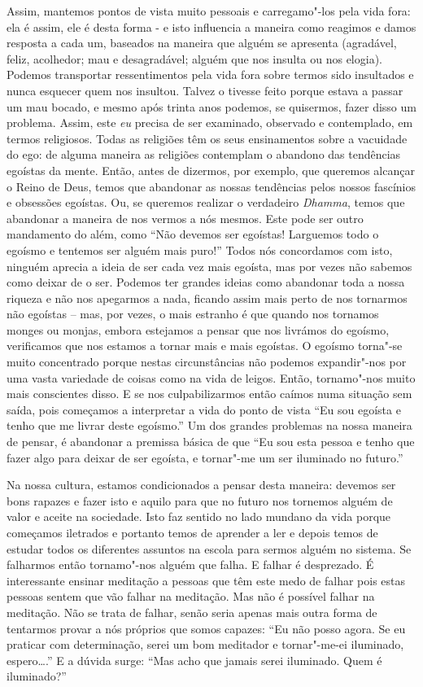 Assim, mantemos pontos de vista muito pessoais e carregamo"-los pela vida
fora: ela é assim, ele é desta forma - e isto influencia a maneira como
reagimos e damos resposta a cada um, baseados na maneira que alguém se
apresenta (agradável, feliz, acolhedor; mau e desagradável; alguém que
nos insulta ou nos elogia). Podemos transportar ressentimentos pela vida
fora sobre termos sido insultados e nunca esquecer quem nos insultou.
Talvez o tivesse feito porque estava a passar um mau bocado, e mesmo
após trinta anos podemos, se quisermos, fazer disso um problema. Assim,
este \emph{eu} precisa de ser examinado, observado e contemplado, em
termos religiosos. Todas as religiões têm os seus ensinamentos sobre a
vacuidade do ego: de alguma maneira as religiões contemplam o abandono
das tendências egoístas da mente. Então, antes de dizermos, por exemplo,
que queremos alcançar o Reino de Deus, temos que abandonar as nossas
tendências pelos nossos fascínios e obsessões egoístas. Ou, se queremos
realizar o verdadeiro \emph{Dhamma}, temos que abandonar a maneira de
nos vermos a nós mesmos. Este pode ser outro mandamento do além, como
``Não devemos ser egoístas! Larguemos todo o egoísmo e tentemos ser
alguém mais puro!'' Todos nós concordamos com isto, ninguém aprecia a
ideia de ser cada vez mais egoísta, mas por vezes não sabemos como
deixar de o ser. Podemos ter grandes ideias como abandonar toda a nossa
riqueza e não nos apegarmos a nada, ficando assim mais perto de nos
tornarmos não egoístas -- mas, por vezes, o mais estranho é que quando
nos tornamos monges ou monjas, embora estejamos a pensar que nos
livrámos do egoísmo, verificamos que nos estamos a tornar mais e mais
egoístas. O egoísmo torna"-se muito concentrado porque nestas
circunstâncias não podemos expandir"-nos por uma vasta variedade de
coisas como na vida de leigos. Então, tornamo"-nos muito mais conscientes
disso. E se nos culpabilizarmos então caímos numa situação sem saída,
pois começamos a interpretar a vida do ponto de vista ``Eu sou egoísta e
tenho que me livrar deste egoísmo.'' Um dos grandes problemas na nossa
maneira de pensar, é abandonar a premissa básica de que ``Eu sou esta
pessoa e tenho que fazer algo para deixar de ser egoísta, e tornar"-me um
ser iluminado no futuro.''

Na nossa cultura, estamos condicionados a pensar desta maneira: devemos
ser bons rapazes e fazer isto e aquilo para que no futuro nos tornemos
alguém de valor e aceite na sociedade. Isto faz sentido no lado mundano
da vida porque começamos iletrados e portanto temos de aprender a ler e
depois temos de estudar todos os diferentes assuntos na escola para
sermos alguém no sistema. Se falharmos então tornamo"-nos alguém que
falha. E falhar é desprezado. É interessante ensinar meditação a pessoas
que têm este medo de falhar pois estas pessoas sentem que vão falhar na
meditação. Mas não é possível falhar na meditação. Não se trata de
falhar, senão seria apenas mais outra forma de tentarmos provar a nós
próprios que somos capazes: ``Eu não posso agora. Se eu praticar com
determinação, serei um bom meditador e tornar"-me-ei iluminado,
espero\ldots{}.'' E a dúvida surge: ``Mas acho que jamais serei iluminado.
Quem é iluminado?''

